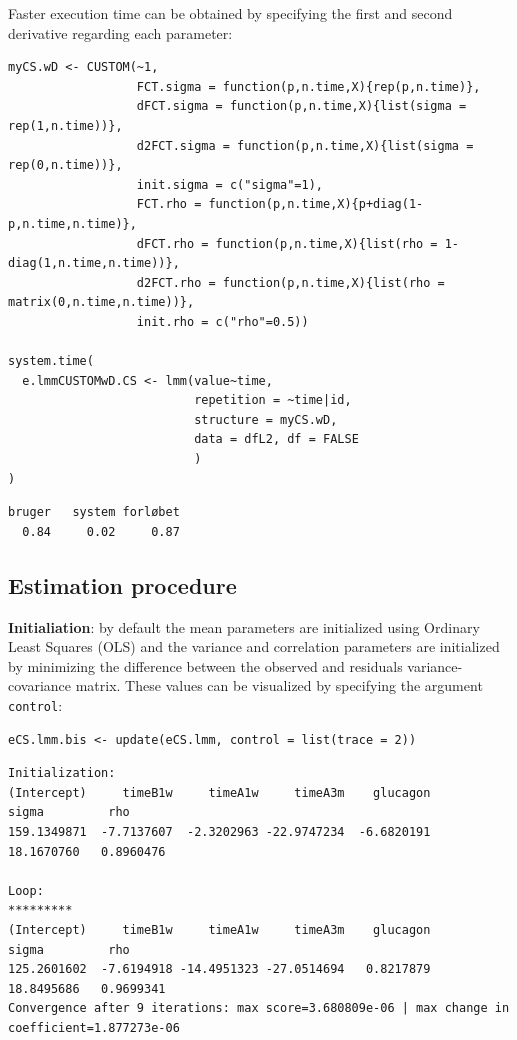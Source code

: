 \documentclass[12pt]{article}
\begin{document}
Faster execution time can be obtained by specifying the first and
second derivative regarding each parameter:
\lstset{language=r,label= ,caption= ,captionpos=b,numbers=none}
\begin{lstlisting}
myCS.wD <- CUSTOM(~1,
                  FCT.sigma = function(p,n.time,X){rep(p,n.time)},
                  dFCT.sigma = function(p,n.time,X){list(sigma = rep(1,n.time))},
                  d2FCT.sigma = function(p,n.time,X){list(sigma = rep(0,n.time))},
                  init.sigma = c("sigma"=1),
                  FCT.rho = function(p,n.time,X){p+diag(1-p,n.time,n.time)},
                  dFCT.rho = function(p,n.time,X){list(rho = 1-diag(1,n.time,n.time))},
                  d2FCT.rho = function(p,n.time,X){list(rho = matrix(0,n.time,n.time))},
                  init.rho = c("rho"=0.5))

system.time(
  e.lmmCUSTOMwD.CS <- lmm(value~time,
                          repetition = ~time|id,
                          structure = myCS.wD, 
                          data = dfL2, df = FALSE
                          )
)
\end{lstlisting}

\begin{verbatim}
bruger   system forløbet 
  0.84     0.02     0.87
\end{verbatim}



\clearpage

\subsection{Estimation procedure}
\label{sec:org66e0891}

\textbf{Initialiation}: by default the mean parameters are initialized using
 Ordinary Least Squares (OLS) and the variance and correlation
 parameters are initialized by minimizing the difference between the
 observed and residuals variance-covariance matrix. These values can
 be visualized by specifying the argument \texttt{control}:
\lstset{language=r,label= ,caption= ,captionpos=b,numbers=none}
\begin{lstlisting}
eCS.lmm.bis <- update(eCS.lmm, control = list(trace = 2))
\end{lstlisting}

\begin{verbatim}
Initialization:
(Intercept)     timeB1w     timeA1w     timeA3m    glucagon       sigma         rho 
159.1349871  -7.7137607  -2.3202963 -22.9747234  -6.6820191  18.1670760   0.8960476 

Loop:
*********
(Intercept)     timeB1w     timeA1w     timeA3m    glucagon       sigma         rho 
125.2601602  -7.6194918 -14.4951323 -27.0514694   0.8217879  18.8495686   0.9699341 
Convergence after 9 iterations: max score=3.680809e-06 | max change in coefficient=1.877273e-06
\end{verbatim}
\end{document}
